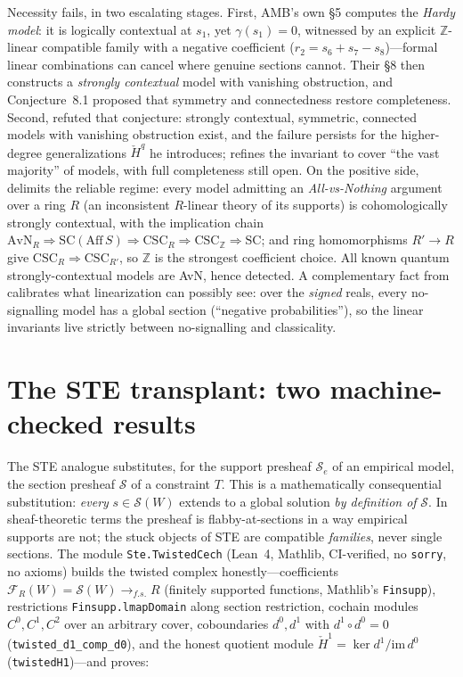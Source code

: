 \documentclass[11pt]{article}
\newcommand{\lean}[1]{\texttt{#1}}
\newcommand{\Hc}[1]{\check{H}^{#1}}
\newcommand{\FR}{\mathcal{F}_R}
\newcommand{\Sec}{\mathcal{S}}
\newcommand{\Z}{\mathbb{Z}}
\begin{document}
Necessity fails, in two escalating stages.  First, AMB's own \S5
computes the \emph{Hardy model}: it is logically contextual at $s_1$,
yet $\gamma(s_1) = 0$, witnessed by an explicit $\Z$-linear compatible
family with a negative coefficient ($r_2 = s_6 + s_7 - s_8$)---formal
linear combinations can cancel where genuine sections cannot.  Their
\S8 then constructs a \emph{strongly contextual} model with vanishing
obstruction, and Conjecture~8.1 proposed that symmetry and
connectedness restore completeness.  Second,
\citet{caru2017cohomology} refuted that conjecture: strongly
contextual, symmetric, connected models with vanishing obstruction
exist, and the failure persists for the higher-degree generalizations
$\Hc{q}$ he introduces; \citet{caru2018complete} refines the invariant
to cover ``the vast majority'' of models, with full completeness still
open.  On the positive side, \citet[Thm.~21]{abramsky2015paradox}
delimits the reliable regime: every model admitting an
\emph{All-vs-Nothing} argument over a ring $R$ (an inconsistent
$R$-linear theory of its supports) is cohomologically strongly
contextual, with the implication chain $\mathrm{AvN}_R \Rightarrow
\mathrm{SC}(\mathrm{Aff}\,S) \Rightarrow \mathrm{CSC}_R \Rightarrow
\mathrm{CSC}_\Z \Rightarrow \mathrm{SC}$; and ring homomorphisms
$R' \to R$ give $\mathrm{CSC}_R \Rightarrow \mathrm{CSC}_{R'}$, so
$\Z$ is the strongest coefficient choice.  All known quantum
strongly-contextual models are AvN, hence detected.  A complementary
fact from \citet{abramsky2011sheaf} calibrates what linearization can
possibly see: over the \emph{signed} reals, every no-signalling model
has a global section (``negative probabilities''), so the linear
invariants live strictly between no-signalling and classicality.

\section{The STE transplant: two machine-checked results}
\label{sec:ste}

The STE analogue substitutes, for the support presheaf $\Sec_e$ of an
empirical model, the section presheaf $\Sec$ of a constraint $T$.
This is a mathematically consequential substitution: \emph{every}
$s \in \Sec(W)$ extends to a global solution \emph{by definition of}
$\Sec$.  In sheaf-theoretic terms the presheaf is flabby-at-sections
in a way empirical supports are not; the stuck objects of STE are
compatible \emph{families}, never single sections.  The module
\lean{Ste.TwistedCech} (Lean~4, Mathlib, CI-verified, no \lean{sorry},
no axioms) builds the twisted complex honestly---coefficients
$\FR(W) = \Sec(W) \to_{f.s.} R$ (finitely supported functions,
Mathlib's \lean{Finsupp}), restrictions
\lean{Finsupp.lmapDomain} along section restriction, cochain modules
$C^0, C^1, C^2$ over an arbitrary cover, coboundaries $d^0, d^1$ with
$d^1 \circ d^0 = 0$ (\lean{twisted\_d1\_comp\_d0}), and the honest
quotient module $\Hc{1} = \ker d^1 / \mathrm{im}\, d^0$
(\lean{twistedH1})---and proves:
\end{document}

